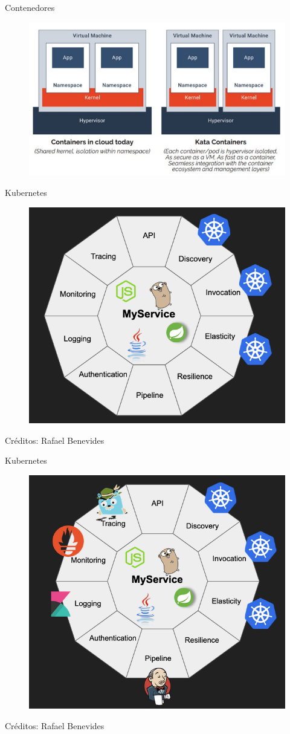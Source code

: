 \documentclass[aspectratio=169]{beamer}
\begin{document}
\begin{frame}{Contenedores}
    \begin{figure}
        \centering
        \includegraphics[width=0.5\linewidth]{Images/dockerkata.jpg}
    \end{figure}
\end{frame}

\begin{frame}{Kubernetes}
    \begin{figure}
        \centering
        \includegraphics[width=0.5\linewidth]{Images/kube1.png}
        \label{fig:container}
    \end{figure}

    Créditos: Rafael Benevides
\end{frame}


\begin{frame}{Kubernetes}
    \begin{figure}
        \centering
        \includegraphics[width=0.5\linewidth]{Images/kube2.png}
        \label{fig:container}
    \end{figure}

    Créditos: Rafael Benevides
\end{frame}
\end{document}
